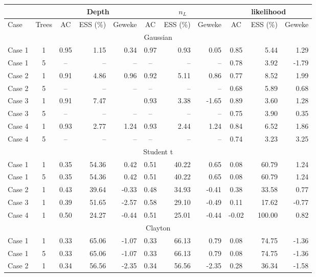 \documentclass{amsart}
\begin{document}
\begin{table}[ht]
	\centering
	\scriptsize{
		\begin{tabular}{lc|crr|crr|crr}
			\toprule
			\multicolumn{2}{c|}{} &
			\multicolumn{3}{c|}{Depth} &
			\multicolumn{3}{c|}{$n_L$} &
			\multicolumn{3}{c}{likelihood} \\
			\midrule
			Case & Trees & AC & ESS (\%) & Geweke & AC & ESS (\%) & Geweke & AC & ESS (\%) & Geweke \\ 
			\midrule
			\multicolumn{11}{c}{Gaussian} \\
			\midrule
			Case 1 & 1 & 0.95 & 1.15 & 0.34 & 0.97 & 0.93 & 0.05 & 0.85 & 5.44 & 1.29 \\ 
			Case 1 & 5 & -- & -- & -- & -- & -- & -- & 0.78 & 3.92 & -1.79 \\ 
			Case 2 & 1 & 0.91 & 4.86 & 0.96 & 0.92 & 5.11 & 0.86 & 0.77 & 8.52 & 1.99 \\ 
			Case 2 & 5 & -- & -- & -- & -- & -- & -- & 0.68 & 5.89 & 0.68 \\ 
			Case 3 & 1 & 0.91 & 7.47 &  & 0.93 & 3.38 & -1.65 & 0.89 & 3.60 & 1.28 \\ 
			Case 3 & 5 & -- & -- & -- & -- & -- & -- & 0.75 & 3.90 & 0.35 \\ 
			Case 4 & 1 & 0.93 & 2.77 & 1.24 & 0.93 & 2.44 & 1.24 & 0.84 & 6.52 & 1.86 \\ 
			Case 4 & 5 & -- & -- & -- & -- & -- & -- & 0.74 & 3.23 & 3.25 \\ 
			\midrule
			\multicolumn{11}{c}{Student t} \\
			\midrule
			Case 1 & 1 & 0.35 & 54.36 & 0.42 & 0.51 & 40.22 & 0.65 & 0.08 & 60.79 & 1.24 \\ 
			Case 1 & 5 & 0.35 & 54.36 & 0.42 & 0.51 & 40.22 & 0.65 & 0.08 & 60.79 & 1.24 \\ 
			Case 2 & 1 & 0.43 & 39.64 & -0.33 & 0.48 & 34.93 & -0.41 & 0.38 & 33.58 & 0.77 \\ 
			Case 3 & 1 & 0.39 & 51.65 & -2.57 & 0.58 & 29.10 & -0.49 & 0.11 & 17.62 & -0.77 \\ 
			Case 4 & 1 & 0.50 & 24.27 & -0.44 & 0.51 & 25.01 & -0.44 & -0.02 & 100.00 & 0.82 \\ 
			\midrule
			\multicolumn{11}{c}{Clayton} \\
			\midrule
			Case 1 & 1 & 0.33 & 65.06 & -1.07 & 0.33 & 66.13 & 0.79 & 0.08 & 74.75 & -1.36 \\ 
			Case 1 & 5 & 0.33 & 65.06 & -1.07 & 0.33 & 66.13 & 0.79 & 0.08 & 74.75 & -1.36 \\ 
			Case 2 & 1 & 0.34 & 56.56 & -2.35 & 0.34 & 56.56 & -2.35 & 0.28 & 36.34 & -1.58 \\ 

\end{tabular}}
\end{table}
\end{document}
